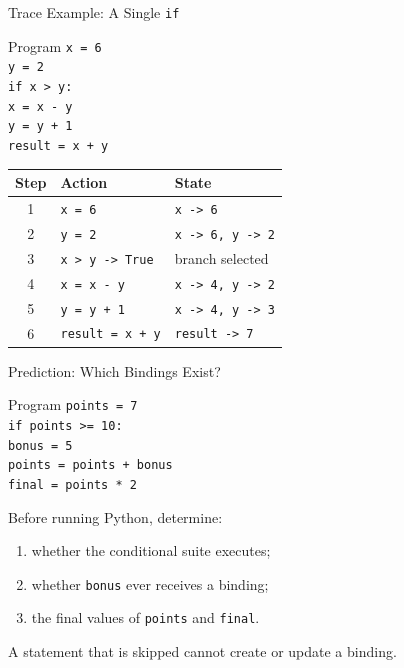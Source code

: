 \documentclass[aspectratio=169,10pt]{beamer}
\begin{document}
\begin{frame}{Trace Example: A Single \texttt{if}}
  \begin{block}{Program}
    \texttt{x = 6}\\
    \texttt{y = 2}\\
    \texttt{if x > y:}\\
    \hspace*{0.20in}\texttt{x = x - y}\\
    \hspace*{0.20in}\texttt{y = y + 1}\\
    \texttt{result = x + y}
  \end{block}

  \begin{center}
    \renewcommand{\arraystretch}{1.14}
    \begin{tabular}{c|l|l}
      \textbf{Step} & \textbf{Action} & \textbf{State} \\\hline
      1 & \texttt{x = 6} & \texttt{x -> 6} \\
      2 & \texttt{y = 2} & \texttt{x -> 6, y -> 2} \\
      3 & \texttt{x > y -> True} & branch selected \\
      4 & \texttt{x = x - y} & \texttt{x -> 4, y -> 2} \\
      5 & \texttt{y = y + 1} & \texttt{x -> 4, y -> 3} \\
      6 & \texttt{result = x + y} & \texttt{result -> 7}
    \end{tabular}
  \end{center}
\end{frame}

\begin{frame}{Prediction: Which Bindings Exist?}
  \begin{block}{Program}
    \texttt{points = 7}\\
    \texttt{if points >= 10:}\\
    \hspace*{0.20in}\texttt{bonus = 5}\\
    \hspace*{0.20in}\texttt{points = points + bonus}\\
    \texttt{final = points * 2}
  \end{block}

  \begin{activity}
    Before running Python, determine:
    \begin{enumerate}
      \item whether the conditional suite executes;
      \item whether \texttt{bonus} ever receives a binding;
      \item the final values of \texttt{points} and \texttt{final}.
    \end{enumerate}
  \end{activity}

  \begin{keyidea}
    A statement that is skipped cannot create or update a binding.
  \end{keyidea}
\end{frame}
\end{document}
